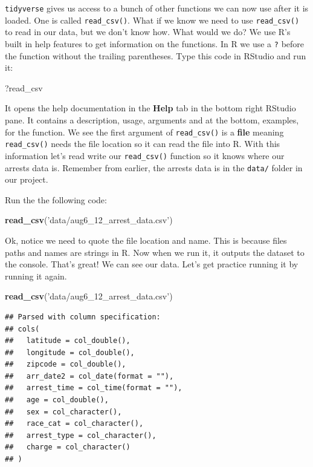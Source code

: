 \documentclass[]{book}
\newenvironment{Shaded}{\begin{snugshade}}{\end{snugshade}}
\newcommand{\KeywordTok}[1]{\textcolor[rgb]{0.13,0.29,0.53}{\textbf{#1}}}
\newcommand{\NormalTok}[1]{#1}
\newcommand{\StringTok}[1]{\textcolor[rgb]{0.31,0.60,0.02}{#1}}
\begin{document}
\texttt{tidyverse} gives us access to a bunch of other functions we can now use after it is loaded. One is called \texttt{read\_csv()}. What if we know we need to use \texttt{read\_csv()} to read in our data, but we don't know how. What would we do? We use R's built in help features to get information on the functions. In R we use a \texttt{?} before the function without the trailing parentheses. Type this code in RStudio and run it:

\begin{Shaded}
\begin{Highlighting}[]
\NormalTok{?read_csv}
\end{Highlighting}
\end{Shaded}

It opens the help documentation in the \textbf{Help} tab in the bottom right RStudio pane. It contains a description, usage, arguments and at the bottom, examples, for the function. We see the first argument of \texttt{read\_csv()} is a \textbf{file} meaning \texttt{read\_csv()} needs the file location so it can read the file into R. With this information let's read write our \texttt{read\_csv()} function so it knows where our arrests data is. Remember from earlier, the arrests data is in the \texttt{data/} folder in our project.

Run the the following code:

\begin{Shaded}
\begin{Highlighting}[]
\KeywordTok{read_csv}\NormalTok{(}\StringTok{'data/aug6_12_arrest_data.csv'}\NormalTok{)}
\end{Highlighting}
\end{Shaded}

Ok, notice we need to quote the file location and name. This is because files paths and names are strings in R. Now when we run it, it outputs the dataset to the console. That's great! We can see our data. Let's get practice running it by running it again.

\begin{Shaded}
\begin{Highlighting}[]
\KeywordTok{read_csv}\NormalTok{(}\StringTok{'data/aug6_12_arrest_data.csv'}\NormalTok{)}
\end{Highlighting}
\end{Shaded}

\begin{verbatim}
## Parsed with column specification:
## cols(
##   latitude = col_double(),
##   longitude = col_double(),
##   zipcode = col_double(),
##   arr_date2 = col_date(format = ""),
##   arrest_time = col_time(format = ""),
##   age = col_double(),
##   sex = col_character(),
##   race_cat = col_character(),
##   arrest_type = col_character(),
##   charge = col_character()
## )
\end{verbatim}
\end{document}
